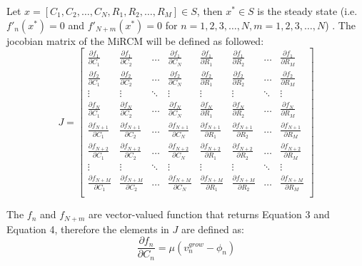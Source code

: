 \documentclass[12pt]{article}
\begin{document}
Let $x=[C_1, C_2, \dots, C_N, R_1, R_2, \dots, R_M] \in S $, then $x^* \in S $ is the steady state (i.e. $f'_n(x^*) = 0$ and $f'_{N+m}(x^*)=0$ for $n=1, 2, 3,\dots, N, m=1, 2, 3, \dots, N$) . The jocobian matrix of the MiRCM will be defined as followed:
\[ J = 
\begin{bmatrix}

    \frac{\partial{f_1}}{\partial{C_1}} & \frac{\partial{f_1}}{\partial{C_2}} & \dots & \frac{\partial{f_1}}{\partial{C_N}} & \frac{\partial{f_1}}{\partial{R_1}} & \frac{\partial{f_1}}{\partial{R_2}} & \dots & \frac{\partial{f_1}}{\partial{R_M}}\\
    \frac{\partial{f_2}}{\partial{C_1}} & \frac{\partial{f_2}}{\partial{C_2}} & \dots & \frac{\partial{f_2}}{\partial{C_N}} & \frac{\partial{f_2}}{\partial{R_1}} & \frac{\partial{f_2}}{\partial{R_2}} & \dots & \frac{\partial{f_2}}{\partial{R_M}}\\
    \vdots & \vdots  & \ddots & \vdots & \vdots & \vdots & \ddots & \vdots\\
    \frac{\partial{f_N}}{\partial{C_1}} & \frac{\partial{f_N}}{\partial{C_2}} & \dots & \frac{\partial{f_N}}{\partial{C_N}} & \frac{\partial{f_N}}{\partial{R_1}} & \frac{\partial{f_N}}{\partial{R_2}} & \dots & \frac{\partial{f_N}}{\partial{R_M}}\\
    \frac{\partial{f_{N+1}}}{\partial{C_1}} & \frac{\partial{f_{N+1}}}{\partial{C_2}} & \dots & \frac{\partial{f_{N+1}}}{\partial{C_N}} & \frac{\partial{f_{N+1}}}{\partial{R_1}} & \frac{\partial{f_{N+1}}}{\partial{R_2}} & \dots & \frac{\partial{f_{N+1}}}{\partial{R_M}}\\
    \frac{\partial{f_{N+2}}}{\partial{C_1}} & \frac{\partial{f_{N+2}}}{\partial{C_2}} & \dots & \frac{\partial{f_{N+2}}}{\partial{C_N}} & \frac{\partial{f_{N+2}}}{\partial{R_1}} & \frac{\partial{f_{N+2}}}{\partial{R_2}} & \dots & \frac{\partial{f_{N+2}}}{\partial{R_M}}\\
    \vdots & \vdots  & \ddots & \vdots & \vdots & \vdots & \ddots & \vdots\\
    \frac{\partial{f_{N+M}}}{\partial{C_1}} & \frac{\partial{f_{N+M}}}{\partial{C_2}} & \dots & \frac{\partial{f_{N+M}}}{\partial{C_N}} & \frac{\partial{f_{N+M}}}{\partial{R_1}} & \frac{\partial{f_{N+M}}}{\partial{R_2}} & \dots & \frac{\partial{f_{N+M}}}{\partial{R_M}}\\
    
    \end{bmatrix}
    \]

The $f_n$ and $f_{N+m}$ are vector-valued function that returns Equation 3 and Equation 4, therefore the elements in $J$ are defined as:
\begin{equation}
    \frac{\partial{f_n}}{\partial{C_n}} = \mu (v^{grow}_n - \phi_n)
\end{equation}
\end{document}
